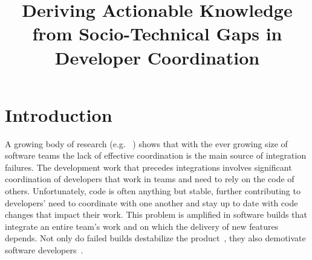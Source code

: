 \documentclass[conference]{IEEEtran}
\begin{document}

\title{Deriving Actionable Knowledge from Socio-Technical Gaps in Developer Coordination}



\author{
\and
{}
}

\maketitle




\IEEEpeerreviewmaketitle

\section{Introduction}
A growing body of research (e.g. ~\cite{kwan:tse:2011,herbsleb:icse:1999}) shows that with the ever growing size of software teams the lack of
effective coordination is the main source of integration failures. The
development work that precedes integrations involves significant coordination of
developers that work in teams and need to rely on the code of others. 
Unfortunately, code is often anything but stable, further contributing to developers' need to coordinate with one another and stay up to date with code changes that impact their work.
This problem is
amplified in software builds that integrate an entire team's work
and on which the delivery of new features depends. Not only do
failed builds destabilize the product~\cite{cusumano1997}, they also demotivate
software developers~\cite{holck2004}.
\end{document}
